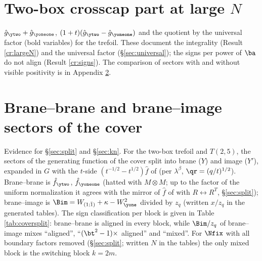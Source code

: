 \section{Two-box crosscap part at large \texorpdfstring{$N$}{N}}\label{app:largeN}
$\hat g_{\ytwo} + \hat g_{\yoneone}$, $(1+t)(\hat g_{\ytwo} - \hat g_{\yoneone})$ and the quotient by the universal factor (bold variables) for the trefoil. These document the integrality (Result \ref{cr:largeN}) and the universal factor (\S\ref{sec:universal}); the signs per power of $\ba$ do not align (Result \ref{cr:signs}). The comparison of sectors with and without visible positivity is in Appendix \ref{app:cover}.


\section{Brane--brane and brane--image sectors of the cover}\label{app:cover}
Evidence for \S\ref{sec:split} and \S\ref{sec:kn}. For the two-box trefoil and $T(2,5)$, the sectors of the generating function of the cover split into brane ($Y$) and image ($Y'$), expanded in $G$ with the $t$-side $(t^{-1/2} - t^{1/2})\hat f$ of \cite{KN17} (per $\lambda^\beta$, $\qr = (q/t)^{1/2}$). Brane--brane is $\hat f_{\ytwo}$, $\hat f_{\yoneone}$ (hatted with $M \otimes M$; up to the factor of the uniform normalization it agrees with the mirror of $\hat f$ of \cite{KN17} with $R \leftrightarrow R^T$, \S\ref{sec:split}); brane--image is $\Bim = W_{(1;\bar1)} + \kappa - W_{\yone}^2$ divided by $z_q$ (written $x/z_q$ in the generated tables). The sign classification per block is given in Table \ref{tab:coversplit}: brane--brane is aligned in every block, while $\Bim/z_q$ of brane--image mixes ``aligned'', ``$(\bt^2 - 1)\times$ aligned'' and ``mixed''. For $\Nfix$ with all boundary factors removed (\S\ref{sec:split}; written $N$ in the tables) the only mixed block is the switching block $k = 2m$.
\begin{table}[htbp]
\caption{Signs of the $G$-expansion per $\lambda^\beta$ block for the sectors of the cover.}\label{tab:coversplit}

\end{table}


